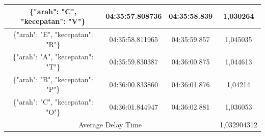 \begin{table}[htpb]
\begin{tabular}{|ccc|c|}
  \multicolumn{1}{|c|}{\{"arah": "C", "kecepatan": "V"\}} & \multicolumn{1}{c|}{04:35:57.808736} & 04:35:58.839       & 1,030264    \\ \hline
  \multicolumn{1}{|c|}{\{"arah": "E", "kecepatan": "R"\}} & \multicolumn{1}{c|}{04:35:58.811965} & 04:35:59.857       & 1,045035    \\ \hline
  \multicolumn{1}{|c|}{\{"arah": "A", "kecepatan": "T"\}} & \multicolumn{1}{c|}{04:35:59.830387} & 04:36:00.875       & 1,044613    \\ \hline
  \multicolumn{1}{|c|}{\{"arah": "B", "kecepatan": "P"\}} & \multicolumn{1}{c|}{04:36:00.833860} & 04:36:01.876       & 1,04214     \\ \hline
  \multicolumn{1}{|c|}{\{"arah": "C", "kecepatan": "O"\}} & \multicolumn{1}{c|}{04:36:01.844947} & 04:36:02.881       & 1,036053    \\ \hline
  \multicolumn{3}{|c|}{Average Delay Time}                                                                            & 1,032904312 \\ \hline
  \end{tabular}
\end{table}

